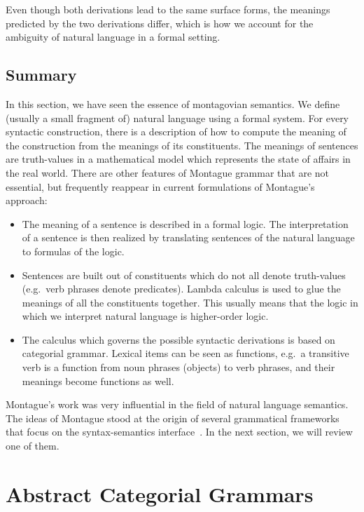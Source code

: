 Even though both derivations lead to the same surface forms, the meanings
predicted by the two derivations differ, which is how we account for the
ambiguity of natural language in a formal setting.

\subsection{Summary}
\label{ssec:montague-summary}

In this section, we have seen the essence of montagovian semantics. We
define (usually a small fragment of) natural language using a formal
system. For every syntactic construction, there is a description of how to
compute the meaning of the construction from the meanings of its
constituents. The meanings of sentences are truth-values in a mathematical
model which represents the state of affairs in the real world. There are
other features of Montague grammar that are not essential, but frequently
reappear in current formulations of Montague's approach:

\begin{itemize}
\item The meaning of a sentence is described in a formal logic. The
  interpretation of a sentence is then realized by translating sentences of
  the natural language to formulas of the logic.
\item Sentences are built out of constituents which do not all denote
  truth-values (e.g.\ verb phrases denote predicates). Lambda calculus is
  used to glue the meanings of all the constituents together. This usually
  means that the logic in which we interpret natural language is
  higher-order logic.
\item The calculus which governs the possible syntactic derivations is
  based on categorial grammar. Lexical items can be seen as functions,
  e.g.\ a transitive verb is a function from noun phrases (objects) to verb
  phrases, and their meanings become functions as well.
\end{itemize}

Montague's work was very influential in the field of natural language
semantics. The ideas of Montague stood at the origin of several grammatical
frameworks that focus on the syntax-semantics
interface~\cite{de2001towards,muskens2001lambda,pollard2008convergent,martin2014dynamic}.
In the next section, we will review one of them.


\section{Abstract Categorial Grammars}
\label{sec:acg}


